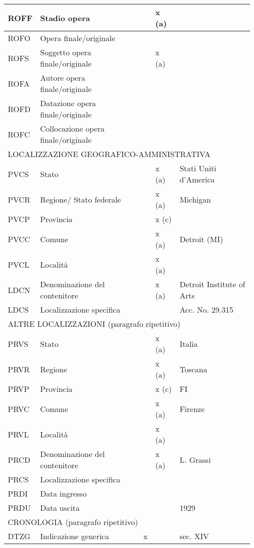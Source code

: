 \begin{center}
\begin{longtable}{ | p{1cm} | p{4cm} | p{.6cm} | p{.6cm} | p{5cm} | }
  ROFF & Stadio opera &  & x (a) &   \\ \hline
  ROFO & Opera finale/originale &  &  &   \\ \hline
  ROFS & Soggetto opera finale/originale &  & x (a) &   \\ \hline
  ROFA & Autore opera finale/originale &  &  &   \\ \hline
  ROFD & Datazione opera finale/originale &  &  &   \\ \hline
  ROFC & Collocazione opera finale/originale &  &  &   \\ \hline
  \multicolumn{5}{|l|}{\cellcolor{lightcyan}LOCALIZZAZIONE GEOGRAFICO-AMMINISTRATIVA} \\ \hline
  PVCS & Stato &  & x (a) & Stati Uniti d'America  \\ \hline
  PVCR & Regione/ Stato federale &  & x (a) & Michigan  \\ \hline
  PVCP & Provincia &  & x (c) &   \\ \hline
  PVCC & Comune &  & x (a) & Detroit (MI)  \\ \hline
  PVCL & Località &  & x (a) &   \\ \hline
  LDCN & Denominazione del contenitore &  & x (a) & Detroit Institute of Arts  \\ \hline
  LDCS & Localizzazione specifica &  &  & Acc. No. 29.315  \\ \hline
  \multicolumn{5}{|l|}{\cellcolor{lightcyan}ALTRE LOCALIZZAZIONI (paragrafo ripetitivo)}  \\ \hline
  PRVS & Stato &  & x (a) & Italia  \\ \hline
  PRVR & Regione &  & x (a) & Toscana  \\ \hline
  PRVP & Provincia &  & x (c) & FI  \\ \hline
  PRVC & Comune &  & x (a) & Firenze  \\ \hline
  PRVL & Località &  & x (a) &   \\ \hline
  PRCD & Denominazione del contenitore &  & x (a) & L. Grassi  \\ \hline
  PRCS & Localizzazione specifica &  &  &   \\ \hline
  PRDI & Data ingresso &  &  &   \\ \hline
  PRDU & Data uscita &  &  & 1929  \\ \hline
  \multicolumn{5}{|l|}{\cellcolor{lightcyan}CRONOLOGIA (paragrafo ripetitivo)} \\ \hline
  DTZG & Indicazione generica & x &  & sec. XIV  \\ \hline

\end{longtable}
\end{center}
